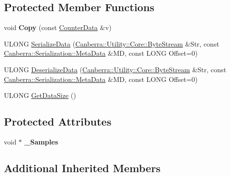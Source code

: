 \subsection*{Protected Member Functions}
\begin{DoxyCompactItemize}
\item 
\mbox{\label{class_canberra_1_1_data_types_1_1_spectroscopy_1_1_counter_data_a76793d78786ae6baf6d6ffd0f5e1f252}} 
void {\bfseries Copy} (const \hyperlink{class_canberra_1_1_data_types_1_1_spectroscopy_1_1_counter_data}{Counter\+Data} \&v)
\item 
U\+L\+O\+NG \hyperlink{class_canberra_1_1_data_types_1_1_spectroscopy_1_1_counter_data_a7cabd7795fc0bb4c0e3a2bb17acfb8c9_a7cabd7795fc0bb4c0e3a2bb17acfb8c9}{Serialize\+Data} (\hyperlink{class_canberra_1_1_utility_1_1_core_1_1_byte_stream}{Canberra\+::\+Utility\+::\+Core\+::\+Byte\+Stream} \&Str, const \hyperlink{class_canberra_1_1_serialization_1_1_meta_data}{Canberra\+::\+Serialization\+::\+Meta\+Data} \&MD, const L\+O\+NG Offset=0)
\item 
U\+L\+O\+NG \hyperlink{class_canberra_1_1_data_types_1_1_spectroscopy_1_1_counter_data_aaeb262fc04a1ea323bc27990d74723e5_aaeb262fc04a1ea323bc27990d74723e5}{Deserialize\+Data} (\hyperlink{class_canberra_1_1_utility_1_1_core_1_1_byte_stream}{Canberra\+::\+Utility\+::\+Core\+::\+Byte\+Stream} \&Str, const \hyperlink{class_canberra_1_1_serialization_1_1_meta_data}{Canberra\+::\+Serialization\+::\+Meta\+Data} \&MD, const L\+O\+NG Offset=0)
\item 
U\+L\+O\+NG \hyperlink{class_canberra_1_1_data_types_1_1_spectroscopy_1_1_counter_data_a7bc6005b442b7d0cbcf4a0b3e5cbc290_a7bc6005b442b7d0cbcf4a0b3e5cbc290}{Get\+Data\+Size} ()
\end{DoxyCompactItemize}
\subsection*{Protected Attributes}
\begin{DoxyCompactItemize}
\item 
\mbox{\label{class_canberra_1_1_data_types_1_1_spectroscopy_1_1_counter_data_a5ac5ebe0d8d180b15866c7053df2772c}} 
void $\ast$ {\bfseries \+\_\+\+Samples}
\end{DoxyCompactItemize}
\subsection*{Additional Inherited Members}


